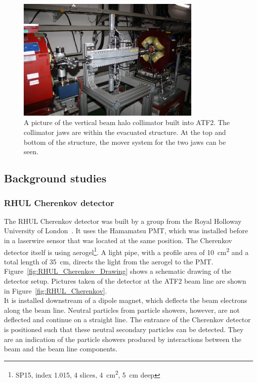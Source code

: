 \begin{figure}
\centering
\includegraphics[width=0.8\textwidth]{Figures/ATF/Installed_Collimator.jpg}
\caption[Picture of the installed beam halo collimator]{A picture of the vertical beam halo collimator built into ATF2. 
The collimator jaws are within the evacuated structure. 
At the top and bottom of the structure, the mover system for the two jaws can be seen.}
\label{fig:installed_collimator}
\end{figure}

\subsection{Background studies}
\subsubsection{RHUL Cherenkov detector}
\label{RHUL}

The RHUL Cherenkov detector was built by a group from the Royal Holloway University of London~\cite{RHUL_detector_wiki}.
It uses the Hamamatsu PMT, which was installed before in a laserwire sensor that was located at the same position. 
The Cherenkov detector itself is using aerogel\footnote{SP15, index 1.015, 4 slices, \SI{4}{\centi\meter\squared}, \SI{5}{\centi\meter} deep}. 
A light pipe, with a profile area of \SI{10}{\centi\metre\squared} and a total length of \SI{35}{\centi\metre}, directs the light from the aerogel to the PMT.
Figure~\ref{fig:RHUL_Cherenkov_Drawing} shows a schematic drawing of the detector setup.
Pictures taken of the detector at the ATF2 beam line are shown in Figure~\ref{fig:RHUL_Cherenkov}.
\\It is installed downstream of a dipole magnet, which deflects the beam electrons along the beam line.
Neutral particles from particle showers, however, are not deflected and continue on a straight line.
The entrance of the Cherenkov detector is positioned such that these neutral secondary particles can be detected.
They are an indication of the particle showers produced by interactions between the beam and the beam line components.

